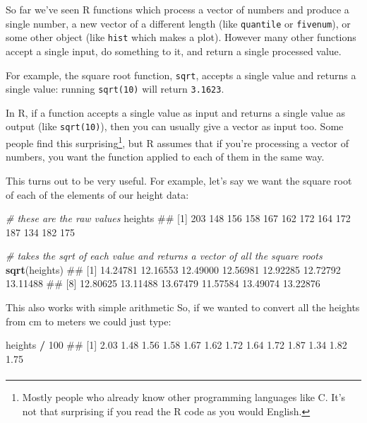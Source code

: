 \documentclass[]{article}
\newenvironment{Shaded}{\begin{snugshade}}{\end{snugshade}}
\newcommand{\KeywordTok}[1]{\textcolor[rgb]{0.13,0.29,0.53}{\textbf{#1}}}
\newcommand{\DecValTok}[1]{\textcolor[rgb]{0.00,0.00,0.81}{#1}}
\newcommand{\StringTok}[1]{\textcolor[rgb]{0.31,0.60,0.02}{#1}}
\newcommand{\CommentTok}[1]{\textcolor[rgb]{0.56,0.35,0.01}{\textit{#1}}}
\newcommand{\OperatorTok}[1]{\textcolor[rgb]{0.81,0.36,0.00}{\textbf{#1}}}
\newcommand{\NormalTok}[1]{#1}
\let\oldparagraph\paragraph
\renewcommand{\paragraph}[1]{\oldparagraph{#1}\mbox{}}
\let\rmarkdownfootnote\footnote%
\def\footnote{\protect\rmarkdownfootnote}
\theoremstyle{definition}
\theoremstyle{definition}
\theoremstyle{definition}
\theoremstyle{remark}
\begin{document}
So far we've seen R functions which process a vector of numbers and
produce a single number, a new vector of a different length (like
\texttt{quantile} or \texttt{fivenum}), or some other object (like
\texttt{hist} which makes a plot). However many other functions accept a
single input, do something to it, and return a single processed value.

For example, the square root function, \texttt{sqrt}, accepts a single
value and returns a single value: running \texttt{sqrt(10)} will return
\texttt{3.1623}.

In R, if a function accepts a single value as input and returns a single
value as output (like \texttt{sqrt(10)}), then you can usually give a
vector as input too. Some people find this surprising\footnote{Mostly
  people who already know other programming languages like C. It's not
  that surprising if you read the R code as you would English.}, but R
assumes that if you're processing a vector of numbers, you want the
function applied to each of them in the same way.

This turns out to be very useful. For example, let's say we want the
square root of each of the elements of our height data:

\begin{Shaded}
\begin{Highlighting}[]
\CommentTok{# these are the raw values}
\NormalTok{heights}
\NormalTok{##  [1] 203 148 156 158 167 162 172 164 172 187 134 182 175}

\CommentTok{# takes the sqrt of each value and returns a vector of all the square roots}
\KeywordTok{sqrt}\NormalTok{(heights)}
\NormalTok{##  [1] 14.24781 12.16553 12.49000 12.56981 12.92285 12.72792 13.11488}
\NormalTok{##  [8] 12.80625 13.11488 13.67479 11.57584 13.49074 13.22876}
\end{Highlighting}
\end{Shaded}

This also works with simple arithmetic So, if we wanted to convert all
the heights from cm to meters we could just type:

\begin{Shaded}
\begin{Highlighting}[]
\NormalTok{heights }\OperatorTok{/}\StringTok{ }\DecValTok{100}
\NormalTok{##  [1] 2.03 1.48 1.56 1.58 1.67 1.62 1.72 1.64 1.72 1.87 1.34 1.82 1.75}
\end{Highlighting}
\end{Shaded}

\hypertarget{paste}{\paragraph{}\label{paste}}
\end{document}
